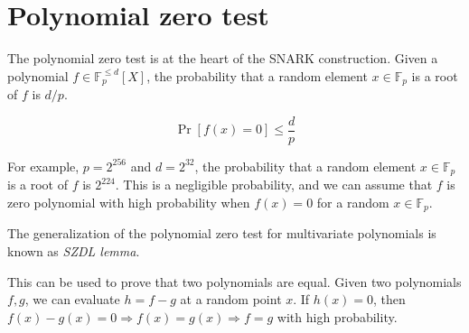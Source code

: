 \setcounter{figure}{0}
\setcounter{listing}{0}

\chapter{Polynomial zero test}
\label{appendix:zero_test}
\renewcommand*{\thepage}{A-\arabic{page}}

\begin{refsegment}

The polynomial zero test is at the heart of the SNARK construction. Given a
polynomial $f \in \mathbb{F}_p^{\leq d}[X]$, the probability that a random
element $x \in \mathbb{F}_p$ is a root of $f$ is $d/p$.

\[ \Pr[f(x) = 0] \leq \frac{d}{p} \]

For example, $p = 2^{256}$ and $d = 2^{32}$, the probability that a random
element $x \in \mathbb{F}_p$ is a root of $f$ is $2^{224}$. This is a negligible
probability, and we can assume that $f$ is zero polynomial with high
probability when $f(x) = 0$ for a random $x \in \mathbb{F}_p$.

The generalization of the polynomial zero test for multivariate polynomials is
known as \textit{SZDL lemma}.

This can be used to prove that two polynomials are equal. Given two polynomials
$f, g$, we can evaluate $h = f - g$ at a random point $x$. If $h(x) = 0$, then
$f(x) - g(x) = 0 \Longrightarrow f(x) = g(x) \Longrightarrow f = g$ with high probability.

\printbibliography[heading=referencessec,segment=\therefsegment,resetnumbers=true]

\end{refsegment}
